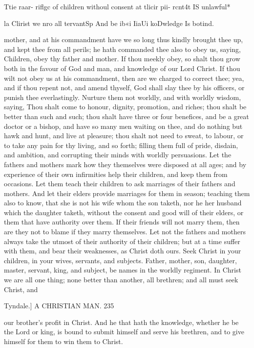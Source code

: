 \documentclass{custom}
\begin{document}
{Ttie raar- 
riflgc of 
children 
withoul 
consent at 
tlicir pii- 
rcnt4t IS 
unlawful* 

la Clirist 
we nro all 
tervantSp 
And be 
ib«i IiaUi 
koDwledge 
Is botind. 

mother, and at his commandment have we so long thus
kindly brought thee up, and kept thee from all perils; he 
hath commanded thee also to obey us, saying, Children,
obey thy father and mother. If thou meekly obey, so 
shalt thou grow both in the favour of God and man, and 
knowledge of our Lord Christ. If thou wilt not obey us 
at his commandment, then are we charged to correct thee;
yea, and if thou repent not, and amend thyself, God shall 
slay thee by his officers, or punish thee everlastingly. 
Nurture them not worldly, and with worldly wisdom, 
saying, Thou shalt come to honour, dignity, promotion, 
and riches; thou shalt be better than such and such; thou 
shalt have three or four benefices, and be a great doctor or 
a bishop, and have so many men waiting on thee, and do 
nothing but hawk and hunt, and live at pleasure; thou 
shalt not need to sweat, to labour, or to take any pain for 
thy living, and so forth; filling them full of pride, disdain,
and ambition, and corrupting their minds with worldly 
persuasions. Let the fathers and mothers mark how they 
themselves were disposed at all ages; and by experience 
of their own infirmities help their children, and keep 
them from occasions. Let them teach their children to 
ask marriages of their fathers and mothers. And let their 
elders provide marriages for them in season; teaching 
them also to know, that she is not his wife whom the son 
taketh, nor he her husband which the daughter taketh, 
without the consent and good will of their elders, or them 
that have authority over them. If their friends will not 
marry them, then are they not to blame if they marry 
themselves. Let not the fathers and mothers always take 
the utmost of their authority of their children; but at a 
time suffer with them, and bear their weaknesses, as Christ 
doth ours. Seek Christ in your children, in your wives, 
servants, and subjects. Father, mother, son, daughter, 
master, servant, king, and subject, be names in the worldly 
regiment. In Christ we are all one thing; none better 
than another, all brethren; and all must seek Christ, and 


Tyndale.] 
A CHRISTIAN MAN. 
235 

our brother's profit in Christ. And he that hath the 
knowledge, whether he be the Lord or king, is bound to 
submit himself and serve his brethren, and to give himself 
for them to win them to Christ. 

}
\end{document}
